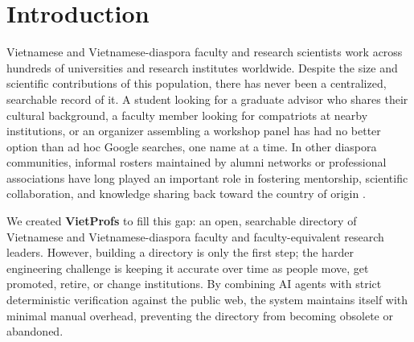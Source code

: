 \documentclass[11pt]{article}
\begin{document}
\section{Introduction}
\label{sec:intro}
Vietnamese and Vietnamese-diaspora faculty and research scientists work across hundreds of universities and research institutes worldwide.
Despite the size and scientific contributions of this population, there has never been a centralized, searchable record of it.
A student looking for a graduate advisor who shares their cultural background, a faculty member looking for compatriots at nearby institutions, or an organizer assembling a workshop panel has had no better option than ad hoc Google searches, one name at a time.
In other diaspora communities, informal rosters maintained by alumni networks or professional associations have long played an important role in fostering mentorship, scientific collaboration, and knowledge sharing back toward the country of origin \cite{meyer1999scientific,kerr2008ethnic}.

We created \textbf{VietProfs} to fill this gap: an open, searchable directory of Vietnamese and Vietnamese-diaspora faculty and faculty-equivalent research leaders.
However, building a directory is only the first step; the harder engineering challenge is keeping it accurate over time as people move, get promoted, retire, or change institutions.
By combining AI agents with strict deterministic verification against the public web, the system maintains itself with minimal manual overhead, preventing the directory from becoming obsolete or abandoned.
\end{document}
